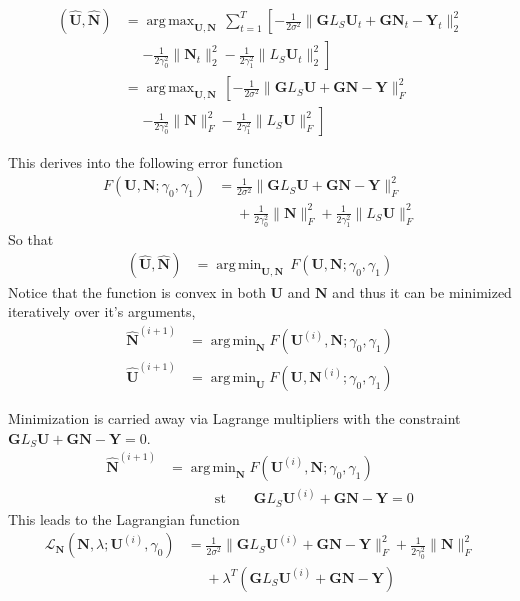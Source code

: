 \documentclass[progressbar=head]{beamer}
\newcommand{\ppar}[1]{ \left( #1 \right) }
\DeclareMathOperator*{\argmax}{arg\,max}
\DeclareMathOperator*{\argmin}{arg\,min}
\newcommand{\nnorm}[1]{\lVert #1 \rVert}
\newcommand{\Y}{\mathbf{Y}}
\newcommand{\G}{\mathbf{G}}
\newcommand{\U}{\mathbf{U}}
\newcommand{\N}{\mathbf{N}}
\begin{document}
\begin{frame}
\begin{align*}
\ppar{ \hat{\U}, \hat{\N} } 
&=
    \argmax_{\U, \N }\, \sum_{t=1}^T  \left[
    -\frac{1}{2\sigma^2}
    \nnorm{\G L_S \U_t + \G \N_t - \Y_t}_2^2
    \right.
    \\
    &\phantom{=}
    \left.
    -
    \frac{1}{2\gamma_0^2} \nnorm{\N_t}_2^2
    -
    \frac{1}{2\gamma_1^2} \nnorm{L_S \U_t}_2^2
    \right]
    \\
    &=
    \argmax_{\U, \N }\, \left[
    -\frac{1}{2\sigma^2}
    \nnorm{\G L_S \U + \G \N - \Y}_F^2
    \right.
    \\
    &\phantom{=}
    \left.
    -
    \frac{1}{2\gamma_0^2} \nnorm{\N}_F^2
    -
    \frac{1}{2\gamma_1^2} \nnorm{L_S \U}_F^2
    \right]
\end{align*}
\end{frame}

\begin{frame}
This derives into the following error function
\begin{align*}
    F\ppar{ {\U}, {\N};  \gamma_0, \gamma_1} &=
    \frac{1}{2\sigma^2}
    \nnorm{\G L_S \U + \G \N - \Y}_F^2
    \nonumber \\
    &\phantom{=}
    +
    \frac{1}{2\gamma_0^2} \nnorm{\N}_F^2
    +
    \frac{1}{2\gamma_1^2} \nnorm{L_S \U}_F^2
\end{align*}
So that
\begin{align*}
\ppar{ \hat{\U}, \hat{\N} } 
&=
    \argmin_{\U, \N }\, F\ppar{ {\U}, {\N};  \gamma_0, \gamma_1}
\end{align*}
Notice that the function is convex in both $\U$ and $\N$ and thus it can be minimized iteratively over it's arguments,
    \begin{align*}
        \hat{\N}^{(i+1)} &= \argmin_{\N} F\ppar{\U^{(i)},\N; \gamma_0, \gamma_1}
        \\
        \hat{\U}^{(i+1)} &= \argmin_{\U} F\ppar{\U,\N^{(i)}; \gamma_0, \gamma_1}
    \end{align*}
\end{frame}

\begin{frame}
Minimization is carried away via Lagrange multipliers with the constraint $\G L_S \U + \G \N - \Y=0$.
\begin{align*}
    \hat{\N}^{(i+1)} &= \argmin_{\N}  F\ppar{\U^{(i)},\N; \gamma_0, \gamma_1}
    \\
    &\phantom{=}
    \quad \quad
    \text{st} \quad \quad
    \G L_S \U^{(i)} + \G \N - \Y=0
\end{align*}
This leads to the Lagrangian function
\begin{align*}
    \mathscr{L}_\N \ppar{\N, \lambda; \U^{(i)}, \gamma_0}
    &=
    \frac{1}{2\sigma^2}
    \nnorm{\G L_S \U^{(i)} + \G \N - \Y}_F^2
    +
    \frac{1}{2\gamma_0^2} \nnorm{\N}_F^2
    \\
    &\phantom{=}
    +\lambda^T\ppar{\G L_S \U^{(i)} + \G \N - \Y}
\end{align*}
\end{frame}
\end{document}
